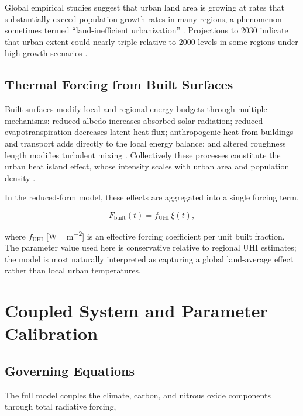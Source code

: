 \documentclass[12pt]{article}
\newcommand{\Fbuilt}{F_{\mathrm{built}}}
\begin{document}
Global empirical studies suggest that urban land area is growing at rates that
substantially exceed population growth rates in many regions, a phenomenon
sometimes termed ``land-inefficient urbanization'' \citep{Angel2011}.  Projections
to 2030 indicate that urban extent could nearly triple relative to 2000 levels in
some regions under high-growth scenarios \citep{Seto2012}.

\subsection{Thermal Forcing from Built Surfaces}

Built surfaces modify local and regional energy budgets through multiple mechanisms:
reduced albedo increases absorbed solar radiation; reduced evapotranspiration
decreases latent heat flux; anthropogenic heat from buildings and transport adds
directly to the local energy balance; and altered roughness length modifies turbulent
mixing \citep{Oke1982}.  Collectively these processes constitute the urban heat island
effect, whose intensity scales with urban area and population density \citep{Zhao2014}.

In the reduced-form model, these effects are aggregated into a single forcing term,

\begin{equation}
  \Fbuilt(t) = f_{\mathrm{UHI}}\,\xi(t),
  \label{eq:Fbuilt}
\end{equation}

where $f_{\mathrm{UHI}}$ [\si{W\,m^{-2}}] is an effective forcing coefficient
per unit built fraction.  The parameter value used here is conservative relative
to regional UHI estimates; the model is most naturally interpreted as capturing a
global land-average effect rather than local urban temperatures.

\section{Coupled System and Parameter Calibration}
\label{sec:integration}

\subsection{Governing Equations}

The full model couples the climate, carbon, and nitrous oxide components through
total radiative forcing,
\end{document}
